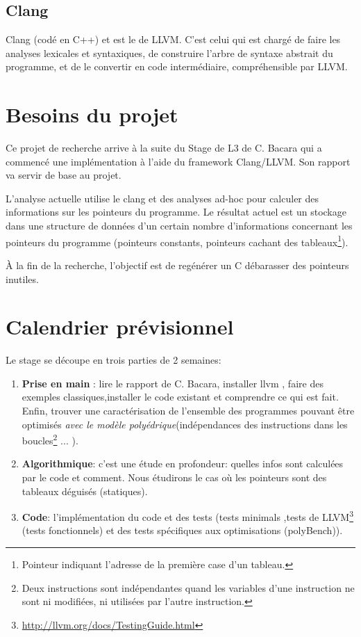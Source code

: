 \documentclass[a4paper,11pt]{article}
\begin{document}
\subsection{Clang}

Clang (codé en C++) et est le  de LLVM. C'est
celui qui est chargé de faire les analyses lexicales et syntaxiques, de
construire l'arbre de syntaxe abstrait du programme, et de le convertir en code
intermédiaire, compréhensible par LLVM.


\section{Besoins du projet}

Ce projet de recherche arrive à la suite du Stage de L3 de 
C. Bacara qui a commencé une implémentation à l'aide du framework Clang/LLVM. 
Son rapport va servir de base au projet.

L'analyse actuelle utilise le  clang et des
analyses ad-hoc pour calculer des informations sur les pointeurs du programme.
Le résultat actuel est un stockage dans une structure de données d'un certain nombre d'informations concernant les pointeurs du programme
(pointeurs constants, pointeurs cachant des tableaux\footnote{Pointeur indiquant l'adresse de la première case d'un tableau.}). 

\`A la fin de la recherche, l'objectif est de regénérer un C débarasser des pointeurs inutiles.


\section{Calendrier prévisionnel}

Le stage se découpe en trois parties de 2 semaines:

\begin{enumerate}
\item \textbf{Prise en main} : lire le rapport de C. Bacara, installer llvm , faire des exemples classiques,installer le code existant et comprendre ce qui est fait. Enfin, trouver une caractérisation de l'ensemble des programmes pouvant être optimisés \emph{avec le modèle polyédrique}(indépendances des instructions dans les boucles\footnote{Deux instructions sont indépendantes quand les variables d'une instruction ne sont ni modifiées, ni utilisées par l'autre instruction.} ... ).

\item \textbf{Algorithmique}: c'est une étude en profondeur: quelles infos sont calculées par le code et comment.
Nous étudirons le cas où les pointeurs sont des tableaux déguisés (statiques).

\item \textbf{Code}: l'implémentation du code et des tests (tests minimals ,tests de LLVM\footnote{\url{http://llvm.org/docs/TestingGuide.html}} (tests fonctionnels) et des tests spécifiques aux optimisations (polyBench)).

\end{enumerate}
\end{document}

